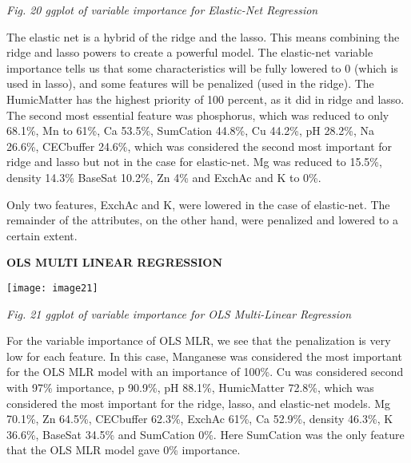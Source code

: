 \documentclass{article} %
\begin{document}
\noindent \textit{Fig. 20 ggplot of variable importance for Elastic-Net Regression}

\noindent 

\noindent The elastic net is a hybrid of the ridge and the lasso. This means combining the ridge and lasso powers to create a powerful model. The elastic-net variable importance tells us that some characteristics will be fully lowered to 0 (which is used in lasso), and some features will be penalized (used in the ridge). The HumicMatter has the highest priority of 100 percent, as it did in ridge and lasso. The second most essential feature was phosphorus, which was reduced to only 68.1\%, Mn to 61\%, Ca 53.5\%, SumCation 44.8\%, Cu 44.2\%, pH 28.2\%, Na 26.6\%, CECbuffer 24.6\%, which was considered the second most important for ridge and lasso but not in the case for elastic-net. Mg was reduced to 15.5\%, density 14.3\% BaseSat 10.2\%, Zn 4\% and ExchAc and K to 0\%.

\noindent Only two features, ExchAc and K, were lowered in the case of elastic-net. The remainder of the attributes, on the other hand, were penalized and lowered to a certain extent.

\noindent \textbf{}

\noindent \textbf{}

\noindent \textbf{OLS MULTI LINEAR REGRESSION}

\noindent \texttt{[image: image21]}

\noindent \textit{Fig. 21 ggplot of variable importance for OLS Multi-Linear Regression}

\noindent 

\noindent For the variable importance of OLS MLR, we see that the penalization is very low for each feature. In this case, Manganese was considered the most important for the OLS MLR model with an importance of 100\%. Cu was considered second with 97\% importance, p 90.9\%, pH 88.1\%, HumicMatter 72.8\%, which was considered the most important for the ridge, lasso, and elastic-net models. Mg 70.1\%, Zn 64.5\%, CECbuffer 62.3\%, ExchAc 61\%, Ca 52.9\%, density 46.3\%, K 36.6\%, BaseSat 34.5\% and SumCation 0\%. Here SumCation was the only feature that the OLS MLR model gave 0\% importance.

\noindent 

\noindent 

\noindent 

\noindent 

\noindent 
\end{document}
